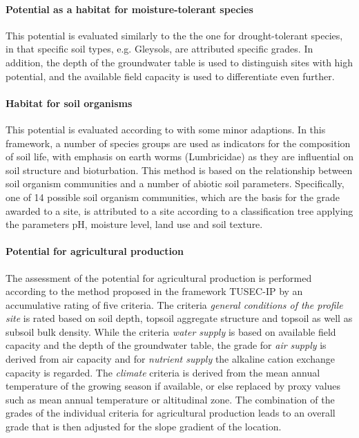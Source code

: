 \documentclass[preprint,12pt,authoryear]{elsarticle}
\begin{document}
\paragraph{Potential as a habitat for moisture-tolerant species}
This potential is evaluated similarly to the the one for drought-tolerant species, in that specific soil types, e.g. Gleysols, are attributed specific grades. In addition, the depth of the groundwater table is used to distinguish sites with high potential, and the available field capacity is used to differentiate even further.
\paragraph{Habitat for soil organisms}
This potential is evaluated according to \cite{Beylich2005} with some minor adaptions. In this framework, a number of species groups are used as indicators for the composition of soil life, with emphasis on earth worms (Lumbricidae) as they are influential on soil structure and bioturbation. This method is based on the relationship between soil organism communities and a number of abiotic soil parameters. Specifically, one of 14 possible soil organism communities, which are the basis for the grade awarded to a site, is attributed to a site according to a classification tree applying the parameters pH, moisture level, land use and soil texture.
\paragraph{Potential for agricultural production}
The assessment of the potential for agricultural production is performed according to the method proposed in the framework TUSEC-IP \citep{Lehmann2008} by an accumulative rating of five criteria. The criteria \emph{general conditions of the profile site} is rated based on soil depth, topsoil aggregate structure and topsoil as well as subsoil bulk density. While the criteria \emph{water supply} is based on available field capacity and the depth of the groundwater table, the grade for \emph{air supply} is derived from air capacity and for \emph{nutrient supply} the alkaline cation exchange capacity is regarded. The \emph{climate} criteria is derived from the mean annual temperature of the growing season if available, or else replaced by proxy values such as mean annual temperature or altitudinal zone. The combination of the grades of the individual criteria for agricultural production leads to an overall grade that is then adjusted for the slope gradient of the location.
\end{document}
